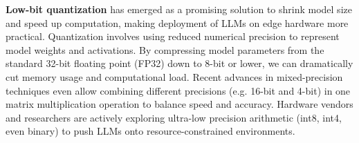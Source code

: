 
\textbf{Low-bit quantization} has emerged as a promising solution to shrink model size and speed up computation, making deployment of LLMs on edge hardware more practical. Quantization involves using reduced numerical precision to represent model weights and activations. By compressing model parameters from the standard 32-bit floating point (FP32) down to 8-bit or lower, we can dramatically cut memory usage and computational load. Recent advances in mixed-precision techniques even allow combining different precisions (e.g. 16-bit and 4-bit) in one matrix multiplication operation to balance speed and accuracy. Hardware vendors and researchers are actively exploring ultra-low precision arithmetic (int8, int4, even binary) to push LLMs onto resource-constrained environments.